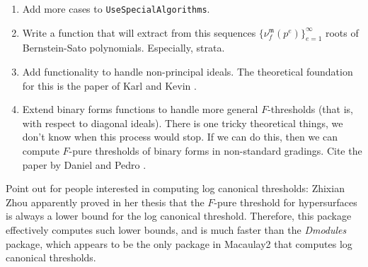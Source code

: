 \documentclass{amsart}
\newcommand{\idealm}{\mathfrak{m}}
\begin{document}
\begin{enumerate}
\item Add more cases to {\tt UseSpecialAlgorithms}.
\item Write a function that will extract from this sequences $\{ \nu_f^{\idealm}(p^e) \}_{e=1}^{\infty}$ roots of Bernstein-Sato polynomials.  Especially, strata.
\item  Add functionality to handle non-principal ideals.  The theoretical foundation for this is the paper of Karl and Kevin \cite{SchwedeTuckerTestIdealsOfNonPrincipal}.
\item Extend binary forms functions to handle more general $F$-thresholds (that is, with respect to diagonal ideals).  There is one tricky theoretical things, we don't know when this process would stop.  If we can do this, then we can compute $F$-pure thresholds of binary forms in non-standard gradings.  Cite the paper by Daniel and Pedro \cite{HernandezTeixeiraFThresholdFunctions}.
\end{enumerate}

{\color{red}  Point out for people interested in computing log canonical thresholds:  Zhixian Zhou apparently proved in her thesis that the $F$-pure threshold for hypersurfaces is always a lower bound for the log canonical threshold.  Therefore, this package effectively computes such lower bounds, and is much faster than the \emph{Dmodules} package, which appears to be the only package in Macaulay2 that computes log canonical thresholds.}



\end{document}
